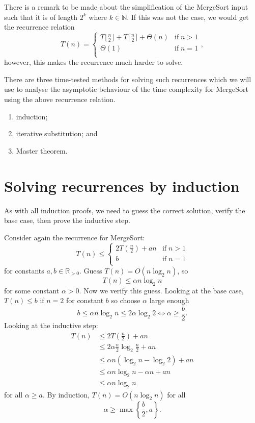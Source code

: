 \begin{remark}
    There is a remark to be made about the simplification of the MergeSort input such that it is of length $2^k$ where $k\in\mathbb N$. If this was not the case, we would get the recurrence relation 
    \[
        T(n)=
        \begin{cases}
            T\lfloor\frac n2\rfloor+T\lceil\frac n2\rceil+\Theta(n)&\text{if}\;n>1\\
            \Theta(1)&\text{if}\;n=1\\
        \end{cases}
        ,
    \]
    however, this makes the recurrence much harder to solve.
\end{remark}

There are three time-tested methods for solving such recurrences which we will use to analyse the asymptotic behaviour of the time complexity for MergeSort using the above recurrence relation.
\begin{enumerate}
    \item induction;
    \item iterative substitution; and
    \item Master theorem.
\end{enumerate}

\section{Solving recurrences by induction}

As with all induction proofs, we need to guess the correct solution, verify the base case, then prove the inductive step.

\begin{example}
    Consider again the recurrence for MergeSort:
    \[
        T(n)\leq
        \begin{cases}
            2T(\frac n2)+an&\text{if}\;n>1\\
            b&\text{if}\;n=1\\
        \end{cases}
    \]
    for constants $a,b\in\mathbb R_{>0}$. Guess $T(n)=O(n\log_2{n})$, so \[T(n)\leq\alpha n\log_2{n}\] for some constant $\alpha>0$. Now we verify this guess. Looking at the base case, $T(n)\leq b$ if $n=2$ for constant $b$ so choose $\alpha$ large enough \[b\leq\alpha n\log_2{n}\leq 2\alpha\log_2{2}\iff\alpha\geq\dfrac b2.\] Looking at the inductive step:
    \begin{align*}
        T(n)&\leq2T\left(\frac n2\right)+an\\
        &\leq2\alpha\frac n2\log_2{\frac n2}+an\\
        &\leq\alpha n(\log_2{n}-\log_2{2})+an\\
        &\leq\alpha n\log_2{n}-\alpha n+an\\
        &\leq\alpha n\log_2{n}
    \end{align*}
    for all $\alpha\geq a$. By induction, $T(n)=O(n\log_2n)$ for all \[\alpha\geq\max\left\{\dfrac b2,a\right\}.\]
\end{example}

